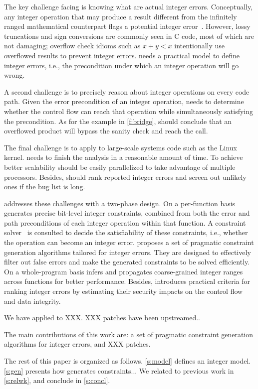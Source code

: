 The key challenge facing \sys is knowing what are actual integer
errors.  Conceptually, any integer operation that may produce a result
different from the infinitely ranged mathematical counterpart flags
a potential integer error~\cite{air}.  However, lossy truncations
and sign conversions are commonly seen in C code, most of which are
not damaging; overflow check idioms such as $x + y < x$ intentionally
use overflowed results to prevent integer errors.  \sys needs a
practical model to define integer errors, i.e., the precondition
under which an integer operation will go wrong.

A second challenge is to precisely reason about integer operations
on every code path.  Given the error precondition of an integer
operation, \sys needs to determine whether the control flow can
reach that operation while simultaneously satisfying the precondition.
As for the example in \autoref{f:bridge}, \sys should conclude that
an overflowed product  will bypass the sanity check and
reach the  call.

The final challenge is to apply \sys to large-scale systems code
such as the Linux kernel.  \sys needs to finish the analysis in a
reasonable amount of time.  To achieve better scalability \sys
should be easily parallelized to take advantage of multiple processors.
Besides, \sys should rank reported integer errors and screen out
unlikely ones if the bug list is long.

\sys addresses these challenges with a two-phase design.
%
On a per-function basis \sys generates precise bit-level integer
constraints, combined from both the error and path preconditions
of each integer operation within that function.  A constraint
solver~\cite{boolector} is consulted to decide the satisfiability
of these constraints, i.e., whether the operation can become an
integer error.  \sys proposes a set of pragmatic constraint generation
algorithms tailored for integer errors.  They are designed to
effectively filter out false errors and make the generated constraints
to be solved efficiently.
%
On a whole-program basis \sys infers and propagates coarse-grained
integer ranges across functions for better performance.
%
Besides, \sys introduces practical criteria for ranking integer
errors by estimating their security impacts on the control flow and
data integrity.

We have applied \sys to XXX.  XXX patches have been upstreamed..

The main contributions of this work are: a set of pragmatic constraint
generation algorithms for integer errors, and XXX patches.

The rest of this paper is organized as follows. \autoref{s:model}
defines an integer model.  \autoref{s:gen} presents how \sys generates
constraints...  We related \sys to previous work in \autoref{s:relwk},
and conclude in \autoref{s:concl}.
